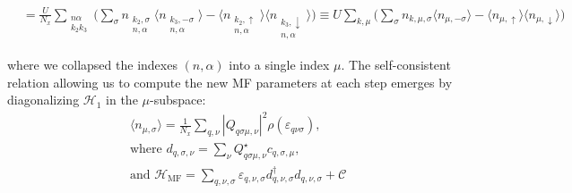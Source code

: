 \begin{strip}
\begin{equation}
\begin{split}
&= \frac{U}{N_x} \sum_{\substack{n \alpha \\ k_2 k_3}} \bigg( \sum_\sigma n_{\substack{k_2, \sigma \\ n, \alpha}} \big\langle n_{\substack{k_3, -\sigma \\ n, \alpha}} \big\rangle - \big\langle n_{\substack{k_2, \uparrow \\ n, \alpha}} \big\rangle \big\langle n_{\substack{k_3, \downarrow \\ n, \alpha}} \big\rangle \bigg) \equiv
U \sum_{k, \mu} \bigg( \sum_\sigma n_{k,\mu, \sigma} \big\langle n_{\mu, -\sigma} \big\rangle - \big\langle n_{\mu, \uparrow} \big\rangle \big\langle n_{\mu, \downarrow} \big\rangle \bigg)
\end{split}
\end{equation}
\end{strip}
where we collapsed the indexes $(n, \alpha)$ into a single index $\mu$.
The self-consistent relation allowing us to compute the new MF parameters at each step emerges by diagonalizing $\mathcal{H}_1$ in the $\mu$-subspace:
\begin{equation}
\begin{split}
&\big\langle n_{\mu, \sigma} \big\rangle = \frac{1}{N_x}\sum_{q, \nu} | Q_{q \sigma \mu, \nu} |^2 \rho ( \varepsilon_{q \nu \sigma} ), \\ &\text{where} \,\, d_{q, \sigma, \nu} = \sum_\nu Q_{q \sigma \mu, \nu}^\star c_{q ,\sigma, \mu} , \\ 
& \text{and} \,\, \mathcal{H}_{\text{MF}} = \sum_{q, \nu, \sigma} \varepsilon_{q, \nu, \sigma} d_{q, \nu, \sigma}^\dagger d_{q, \nu, \sigma} + \mathcal{C}
\end{split}
\end{equation}

